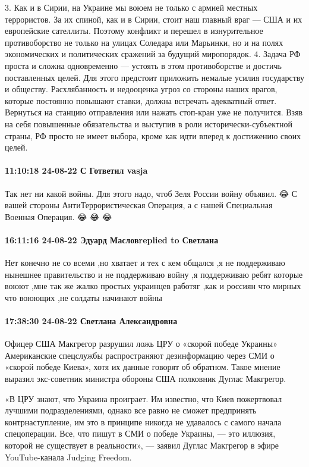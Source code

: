 3. Как и в Сирии, на Украине мы воюем не только с армией местных террористов. За их спиной, как и в Сирии, стоит наш главный враг — США и их европейские сателлиты. Поэтому конфликт и перешел в изнурительное противоборство не только на улицах Соледара или Марьинки, но и на полях экономических и политических сражений за будущий миропорядок.
4. Задача РФ проста и сложна одновременно — устоять в этом противоборстве и достичь поставленных целей. Для этого предстоит приложить немалые усилия государству и обществу. Расхлябанность и недооценка угроз со стороны наших врагов, которые постоянно повышают ставки, должна встречать адекватный ответ. Вернуться на станцию отправления или нажать стоп-кран уже не получится. Взяв на себя повышенные обязательства и выступив в роли исторически-субъектной страны, РФ просто не имеет выбора, кроме как идти вперед к достижению своих целей.

\paragraph{11:10:18 24-08-22 С Гответил vasja}

Так нет ни какой войны. Для этого надо, чтоб Зеля России войну объявил. 😂 С
вашей стороны АнтиТеррористическая Операция, а с нашей Специальная Военная
Операция. 😂 😂 😂

\paragraph{16:11:16 24-08-22 Эдуард Масловreplied to Светлана}

Нет конечно не со всеми ,но хватает и тех с кем общался ,я не поддерживаю
нынешнее правительство и не поддерживаю войну ,я поддерживаю ребят которые
воюют ,мне так же жалко простых украинцев работяг ,как и россиян что мирных что
воюющих ,не солдаты начинают войны

\paragraph{17:38:30 24-08-22 Светлана Александровна}

Офицер США Макгрегор разрушил ложь ЦРУ о «скорой победе Украины» Американские
спецслужбы распространяют дезинформацию через СМИ о «скорой победе Киева», хотя
их данные говорят об обратном. Такое мнение выразил экс-советник министра
обороны США полковник Дуглас Макгрегор.

«В ЦРУ знают, что Украина проиграет. Им известно, что Киев пожертвовал лучшими
подразделениями, однако все равно не сможет предпринять контрнаступление, им
это в принципе никогда не удавалось с самого начала спецоперации. Все, что
пишут в СМИ о победе Украины, — это иллюзия, которой не существует в
реальности», — заявил Дуглас Макгрегор в эфире YouTube-канала Judging Freedom.

